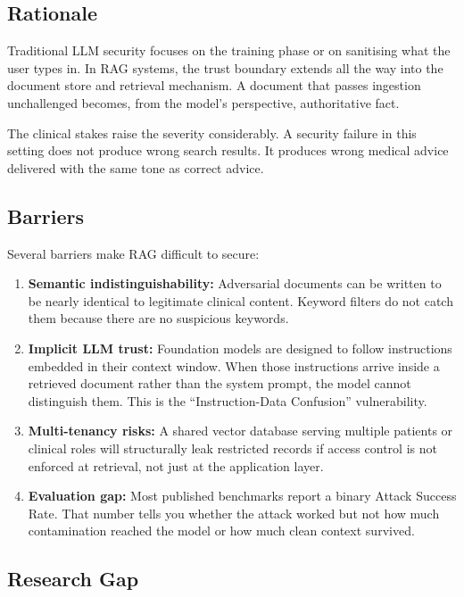 \subsection{Rationale}

Traditional LLM security focuses on the training phase or on sanitising what the user types in. In RAG systems, the trust boundary extends all the way into the document store and retrieval mechanism. A document that passes ingestion unchallenged becomes, from the model's perspective, authoritative fact.

The clinical stakes raise the severity considerably. A security failure in this setting does not produce wrong search results. It produces wrong medical advice delivered with the same tone as correct advice.

\subsection{Barriers}

Several barriers make RAG difficult to secure:
\begin{enumerate}
    \item \textbf{Semantic indistinguishability:} Adversarial documents can be written to be nearly identical to legitimate clinical content. Keyword filters do not catch them because there are no suspicious keywords.
    \item \textbf{Implicit LLM trust:} Foundation models are designed to follow instructions embedded in their context window. When those instructions arrive inside a retrieved document rather than the system prompt, the model cannot distinguish them. This is the ``Instruction-Data Confusion'' vulnerability.
    \item \textbf{Multi-tenancy risks:} A shared vector database serving multiple patients or clinical roles will structurally leak restricted records if access control is not enforced at retrieval, not just at the application layer.
    \item \textbf{Evaluation gap:} Most published benchmarks report a binary Attack Success Rate. That number tells you whether the attack worked but not how much contamination reached the model or how much clean context survived.
\end{enumerate}

\subsection{Research Gap}


